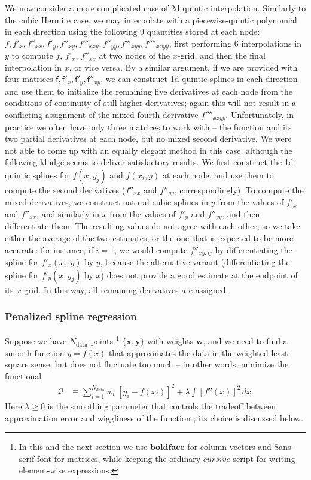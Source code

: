 \documentclass[12pt]{article}
\newcommand{\bx}{\boldsymbol{x}}
\newcommand{\by}{\boldsymbol{y}}
\begin{document}
We now consider a more complicated case of 2d quintic interpolation. Similarly to the cubic Hermite case, we may interpolate with a piecewise-quintic polynomial in each direction using the following 9 quantities stored at each node: $f, f'_x, f''_{xx}, f'_y, f''_{xy}, f'''_{xxy}, f''_{yy}, f'''_{xyy}, f''''_{xxyy}$, first performing 6 interpolations in $y$ to compute $f$, $f'_x$, $f''_{xx}$ at two nodes of the $x$-grid, and then the final interpolation in $x$, or vice versa.
By a similar argument, if we are provided with four matrices $\mathsf{f}, \mathsf{f}'_x, \mathsf{f}'_y, \mathsf{f}''_{xy}$, we can construct 1d quintic splines in each direction and use them to initialize the remaining five derivatives at each node from the conditions of continuity of still higher derivatives; again this will not result in a conflicting assignment of the mixed fourth derivative $f''''_{xxyy}$. Unfortunately, in practice we often have only three matrices to work with -- the function and its two partial derivatives at each node, but no mixed second derivative. We were not able to come up with an equally elegant method in this case, although the following kludge seems to deliver satisfactory results. We first construct the 1d quintic splines for $f(x, y_j)$ and $f(x_i, y)$ at each node, and use them to compute the second derivatives ($f''_{xx}$ and $f''_{yy}$, correspondingly). To compute the mixed derivatives, we construct natural cubic splines in $y$ from the values of $f'_x$ and $f''_{xx}$, and similarly in $x$ from the values of $f'_y$ and $f''_{yy}$, and then differentiate them. The resulting values do not agree with each other, so we take either the average of the two estimates, or the one that is expected to be more accurate: for instance, if $i=1$, we would compute $f''_{xy,ij}$ by differentiating the spline for $f'_x(x_i,y)$ by $y$, because the alternative variant (differentiating the spline for $f'_y(x,y_j)$ by $x$) does not provide a good estimate at the endpoint of its $x$-grid. In this way, all remaining derivatives are assigned.

\subsubsection{Penalized spline regression}  \label{sec:MathSplineApproxDetails}

Suppose we have $N_\mathrm{data}$ points%
\footnote{In this and the next section we use $\boldsymbol{boldface}$ for column-vectors and \textsf{Sans-serif} font for matrices, while keeping the ordinary $cursive$ script for writing element-wise expressions.}%
$\{\bx, \by\}$ with weights $\boldsymbol{w}$, and we need to find a smooth function $y=f(x)$ that approximates the data in the weighted least-square sense, but does not fluctuate too much -- in other words, minimize the functional
\begin{align}  \label{eq:ObjectiveSplineFit}
\mathcal{Q} &\equiv \sum_{i=1}^{N_\mathrm{data}} w_i\;\left[y_i - f(x_i)\right]^2 + \lambda \int \left[f''(x)\right]^2 \,dx .
\end{align}
Here $\lambda\ge 0$ is the smoothing parameter that controls the tradeoff between approximation error and wiggliness of the function \cite{GreenSilverman}; its choice is discussed below.
\end{document}
